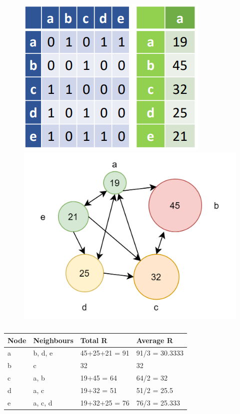 \documentclass[
  notitlepage,
  onecolumn,
  openany]{book}
\begin{document}
\begin{figure}[h!]

{\centering \includegraphics[width=0.5\linewidth]{images/06-Attributes based measures/Untitled 1} \includegraphics[width=0.5\linewidth]{images/06-Attributes based measures/08-graph} 

}

\end{figure}

\begin{table}[]
\centering
\begin{tabular}{@{}llll@{}}
\toprule
\textbf{Node} & \textbf{Neighbours} & \textbf{Total R} & \textbf{Average R} \\ \midrule
a             & b, d, e             & 45+25+21 = 91    & 91/3 = 30.3333     \\
b             & c                   & 32               & 32                 \\
c             & a, b                & 19+45 = 64       & 64/2 = 32          \\
d             & a, c                & 19+32 = 51       & 51/2 = 25.5        \\
e             & a, c, d             & 19+32+25 = 76    & 76/3 = 25.333      \\ \bottomrule
\end{tabular}
\caption{}
\label{tab:my-table}
\end{table}
\end{document}
